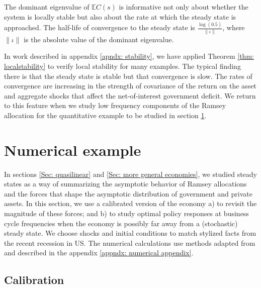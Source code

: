 \documentclass[thmsb,11pt]{article}
\begin{document}
The dominant  eigenvalue of $\mathbb{E}C(s)$ is informative not only about whether the system is locally stable but also about  the rate at which the steady state is approached.
The half-life of convergence to the steady state is  $\frac{\log(0.5)}{\|\iota\|}$, where $\|\iota\|$ is the absolute value of the dominant eigenvalue.

In work described in appendix \ref{apndx: stability}, we have applied  Theorem \ref{thm: localstability} to verify local stability for many examples.
\color{black}
The typical finding there  is that the steady state is stable but that convergence is slow.
The rates of convergence are increasing in the strength of covariance of the return on the asset and aggregate shocks
that affect the net-of-interest government deficit. We return to this feature when we study low frequency components of the Ramsey allocation for the quantitative example to be studied in section \ref{sec: numerical results}.










\section{Numerical example}
\label{sec: numerical results}
In sections \ref{Sec: quasilinear} and \ref{Sec: more general economies},
we studied steady states as a way of summarizing the asymptotic  behavior of Ramsey allocations and the forces that shape  the asymptotic distribution of government and private assets.
In this section, we use a calibrated version of the economy  a) to revisit the magnitude of these forces; and  b) to study optimal policy responses
at business cycle frequencies when the economy is possibly far away from a (stochastic) steady state.
We choose shocks and initial conditions to match stylized facts from the  recent
recession in US. The numerical calculations use methods adapted from \cite{Evans2014}
and described  in the appendix \ref{appndx: numerical appendix}. %



\subsection{Calibration}
\end{document}
